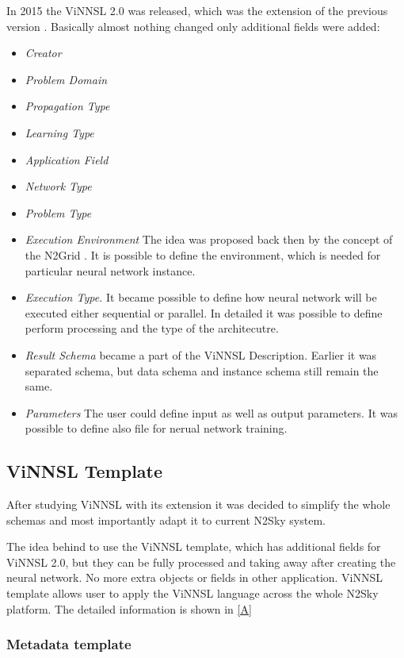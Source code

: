 In 2015 the ViNNSL 2.0 was released, which was the extension of the previous version \cite{ijcnn15}. Basically almost nothing changed only additional fields were added:
\begin{itemize}
\item \emph{Creator}
\item \emph{Problem Domain}
\item \emph{Propagation Type}
\item \emph{Learning Type}
\item \emph{Application Field}
\item \emph{Network Type}
\item \emph{Problem Type}
\item \emph{Execution Environment} The idea was proposed back then by the concept of the N2Grid \cite{schikuta2004n2grid}. It is possible to define the environment, which is needed for particular neural network instance. 
\item \emph{Execution Type.} It became possible to define how neural network will be executed either sequential or parallel. In detailed it was possible to define perform processing and the type of the architecutre.
\item \emph{Result Schema} became a part of the ViNNSL Description. Earlier it was separated schema, but data schema and instance schema still remain the same.
\item \emph{Parameters} The user could define input as well as output parameters. It was possible to define also file for nerual network training.
\end{itemize}

\subsection{ViNNSL Template}\label{ViNNSL Template}

After studying ViNNSL with its extension it was decided to simplify the whole schemas and most importantly adapt it to current N2Sky system.

The idea behind to use the ViNNSL template, which has additional fields for ViNNSL 2.0, but they can be fully processed and taking away after creating the neural network. No more extra objects or fields in other application. ViNNSL template allows user to apply the ViNNSL language across the whole N2Sky platform. The detailed information is shown in \autoref{A}

\subsubsection{Metadata template}\label{Metadata template}

